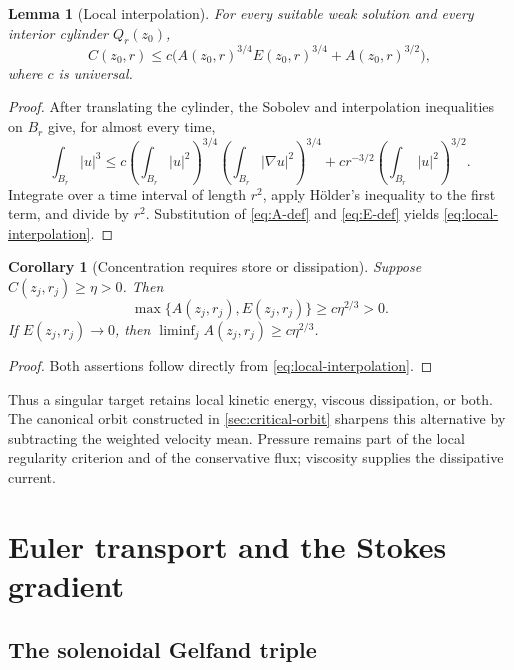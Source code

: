 \documentclass[11pt]{amsart}
\numberwithin{equation}{section}
\theoremstyle{plain}
\newtheorem{lemma}[lemma]{Lemma}
\newtheorem{corollary}[corollary]{Corollary}
\theoremstyle{definition}
\theoremstyle{remark}
\begin{document}
\begin{lemma}[Local interpolation]
\label{lem:local-interpolation}
For every suitable weak solution and every interior cylinder \(Q_r(z_0)\),
\begin{equation}\label{eq:local-interpolation}
 C(z_0,r)
 \le c\bigl(A(z_0,r)^{3/4}E(z_0,r)^{3/4}
            +A(z_0,r)^{3/2}\bigr),
\end{equation}
where \(c\) is universal.
\end{lemma}

\begin{proof}
After translating the cylinder, the Sobolev and interpolation inequalities on
\(B_r\) give, for almost every time,
\[
 \int_{B_r}|u|^3
 \le c
 \left(\int_{B_r}|u|^2\right)^{3/4}
 \left(\int_{B_r}|\nabla u|^2\right)^{3/4}
 +c r^{-3/2}\left(\int_{B_r}|u|^2\right)^{3/2}.
\]
Integrate over a time interval of length \(r^2\), apply H\"older's
inequality to the first term, and divide by \(r^2\).  Substitution of
\eqref{eq:A-def} and \eqref{eq:E-def} yields
\eqref{eq:local-interpolation}.
\end{proof}

\begin{corollary}[Concentration requires store or dissipation]
\label{cor:store-or-dissipation}
Suppose \(C(z_j,r_j)\ge\eta>0\).  Then
\[
 \max\{A(z_j,r_j),E(z_j,r_j)\}\ge c\eta^{2/3}>0.
\]
If \(E(z_j,r_j)\to0\), then
\(\liminf_j A(z_j,r_j)\ge c\eta^{2/3}\).
\end{corollary}

\begin{proof}
Both assertions follow directly from \eqref{eq:local-interpolation}.
\end{proof}

Thus a singular target retains local kinetic energy, viscous dissipation, or
both.  The canonical orbit constructed in \cref{sec:critical-orbit} sharpens
this alternative by subtracting the weighted velocity mean.  Pressure remains
part of the local regularity criterion and of the conservative flux; viscosity
supplies the dissipative current.

\section{Euler transport and the Stokes gradient}
\label{sec:gradient-flow}

\subsection{The solenoidal Gelfand triple}
\end{document}
